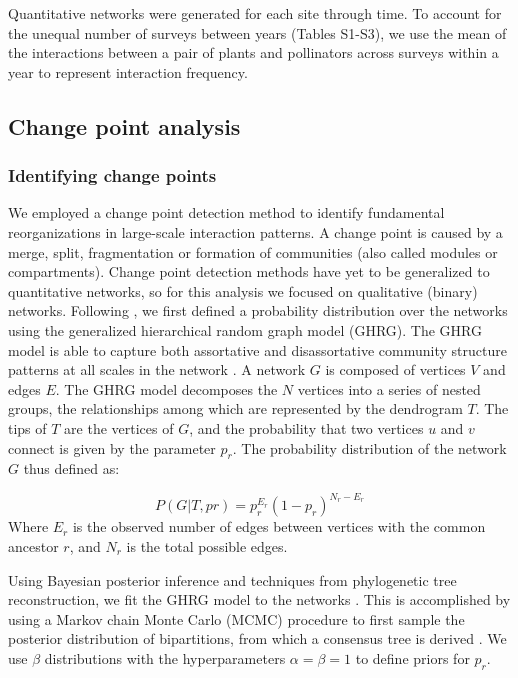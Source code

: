 \documentclass[12pt]{article}
\begin{document}
Quantitative networks were generated for each site through time. To
account for the unequal number of surveys between years (Tables
S1-S3), we use the mean of the interactions between a pair of plants
and pollinators across surveys within a year to represent interaction
frequency.

\subsection*{Change point analysis}
\subsubsection*{Identifying change points}
We employed a change point detection method \citep{peel2014detecting}
to identify fundamental reorganizations in large-scale interaction
patterns. A change point is caused by a merge, split, fragmentation or
formation of communities (also called modules or compartments). Change
point detection methods have yet to be generalized to quantitative
networks, so for this analysis we focused on qualitative (binary)
networks. Following \cite{peel2014detecting}, we first defined a
probability distribution over the networks using the generalized
hierarchical random graph model (GHRG). The GHRG model is able to
capture both assortative and disassortative community structure
patterns at all scales in the network \citep{peel2014detecting}. A
network $G$ is composed of vertices $V$ and edges $E$. The GHRG model
decomposes the $N$ vertices into a series of nested groups, the
relationships among which are represented by the dendrogram $T$. The
tips of $T$ are the vertices of $G$, and the probability that two
vertices $u$ and $v$ connect is given by the parameter $p_r$. The
probability distribution of the network $G$ thus defined as:

\begin{equation}
  \label{eq:lik}
  P(G|T,{pr}) = p_r^{E_r}(1-p_r)^{N_r-E_r}
\end{equation}
% 
Where $E_r$ is the observed number of edges between vertices with the
common ancestor $r$, and $N_r$ is the total possible edges.

Using Bayesian posterior inference and techniques from phylogenetic
tree reconstruction, we fit the GHRG model to the networks
\citep{peel2014detecting}. This is accomplished by using a Markov
chain Monte Carlo (MCMC) procedure to first sample the posterior
distribution of bipartitions, from which a consensus tree is derived
\citep{peel2014detecting}. We use $\beta$ distributions with the
hyperparameters $\alpha=\beta=1$ to define priors for $p_r$.
\end{document}
